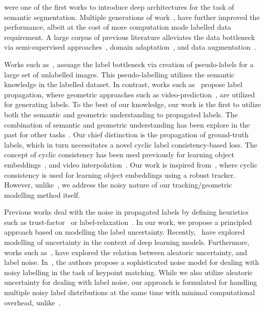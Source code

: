 

\cite{fcn_cvpr, rcnn_1} were one of the first works to introduce deep architectures for the task of semantic segmentation. %
Multiple generations of work~\cite{deeplab_v1, deeplab_v2, pspnet, unet}, have further improved the performance, albeit at the cost of more computation mode labelled data requirement. A large corpus of previous literature alleviates the data bottleneck via semi-supervised approaches~\cite{semi_sup_seg_1, semi_sup_seg_2}, domain adaptation~\cite{domain_seg_1, domain_seg_2, domain_seg_3, domain_seg_nips_1, domain_seg_nips_2, multi_domain_seg}, and data augmentation~\cite{semi_aug_1, semi_aug_2}.

Works such as~\cite{noisy_self}, assuage the label bottleneck via creation of pseudo-labels for a large set of unlabelled images. This pseudo-labelling utilizes the semantic knowledge in the labelled dataset. In contrast, works such as~\cite{lp_eccv, lp_iccvw, lp_2013} propose label propagation, where geometric approaches such as video-prediction~\cite{sdc_net}, are utilized for generating labels.
To the best of our knowledge, our work is the first to utilize both the semantic and geometric understanding to propagated labels.
The combination of semantic and geometric understanding has been explore in the past for other tasks~\cite{future_seg, sem_warp, feelvos2019}. Our chief distinction is the propagation of ground-truth labels, which in turn necessitates a novel cyclic label consistency-based loss. 
The concept of cyclic consistency has been used previously for learning object embeddings~\cite{CVPR2019_CycleTime}, and video interpolation~\cite{cycle_vid_interp}. Our work is inspired from~\cite{CVPR2019_CycleTime}, where cyclic consistency is used for learning object embeddings using a robust tracker. However, unlike~\cite{CVPR2019_CycleTime}, we address the noisy nature of our tracking/geometric modelling method itself.

Previous works deal with the noise in propagated labels by defining heuristics such as trust-factor~\cite{lp_eccv} or label-relaxation~\cite{nvidia_cvpr19}. In our work, we propose a principled approach based on modelling the label uncertainty. Recently,~\cite{gal_main, gal_multitask, uncer_nips_2, uncer_nips_3} have explored modelling of uncertainty in the context of deep learning models. Furthermore, works such as~\cite{uncer_label_1, uncer_label_2}, have explored the relation between aleatoric uncertainty, and label noise. In~\cite{uncer_label_1}, the authors propose a sophisticated noise model for dealing with noisy labelling in the task of keypoint matching. While we also utilize aleatoric uncertainty for dealing with label noise, our approach is formulated for handling multiple noisy label distributions at the same time with minimal computational overhead, unlike~\cite{uncer_label_1}.
